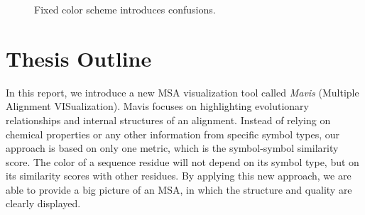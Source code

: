 \begin{figure}[hbt]
\centering
{}
\hspace{5mm}
\caption[Fixed Color Scheme Introduces Confusion]{Fixed color scheme introduces confusions.}\label{fig:intro1}
\end{figure}

\section{Thesis Outline}

In this report, we introduce a new MSA visualization tool called \emph{Mavis} (Multiple Alignment VISualization). Mavis focuses on highlighting evolutionary relationships and internal structures of an alignment. Instead of relying on chemical properties or any other information from specific symbol types, our approach is based on only one metric, which is the symbol-symbol similarity score. The color of a sequence residue will not depend on its symbol type, but on its similarity scores with other residues. By applying this new approach, we are able to provide a big picture of an MSA, in which the structure and quality are clearly displayed.

